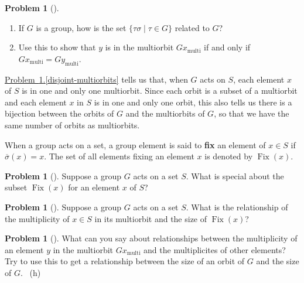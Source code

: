 \documentclass[10pt,]{book}
\newcommand{\terminology}[1]{\textbf{#1}}
\theoremstyle{plain}
\theoremstyle{definition}
\newtheorem{activity}[project]{Problem}
\theoremstyle{definition}
\numberwithin{equation}{chapter}
\DeclareMathOperator{\Fix}{Fix}
\begin{document}
\begin{activity}[]\marginsymbol[-1em]{} \label{activity-292}
\leavevmode%
\begin{enumerate}[font=\bfseries,label=(\alph*),ref=\alph*]
\item\label{compose-right} \marginsymbol[-2.5em]{} \hypertarget{p-1662}{}%
If \(G\) is a group, how is the set \(\{\tau\sigma\mid\tau\in G\}\) related to \(G\)?%
\item\label{disjoint-multiorbits} \marginsymbol[-2.5em]{} \hypertarget{p-1664}{}%
Use this to show that \(y\) is in the multiorbit \(Gx_{\text{multi}}\) if and only if \(Gx_{\text{multi}} = Gy_{\text{multi}}\).%
\end{enumerate}
\end{activity}
\hypertarget{p-1666}{}%
\hyperref[disjoint-multiorbits]{Problem~\ref{activity-292}.\ref{disjoint-multiorbits}} tells us that, when \(G\) acts on \(S\), each element \(x\) of \(S\) is in one and only one multiorbit. Since each orbit is a subset of a multiorbit and each element \(x\) in \(S\) is in one and only one orbit, this also tells us there is a bijection between the orbits of \(G\) and the multiorbits of \(G\), so that we have the same number of orbits as multiorbits.%
\par
\hypertarget{p-1667}{}%
When a group acts on a set, a group element is said to \terminology{fix} an element of \(x \in S\) if \(\overline{\sigma}(x) = x\). The set of all elements fixing an element \(x\) is denoted by \(\Fix(x)\).%
\begin{activity}[]\marginsymbol[-1em]{} \label{activity-293}
\hypertarget{p-1668}{}%
Suppose a group \(G\) acts on a set \(S\). What is special about the subset \(\Fix(x)\) for an element \(x\) of \(S\)?%
\end{activity}
\begin{activity}[] \label{activity-294}
\hypertarget{p-1670}{}%
Suppose a group \(G\) acts on a set \(S\). What is the relationship of the multiplicity of \(x\in S\) in its multiorbit and the size of \(\Fix(x)\)?%
\end{activity}
\begin{activity}[]\marginsymbol[-1em]{} \label{activity-295}
\hypertarget{p-1672}{}%
What can you say about relationships between the multiplicity of an element \(y\) in the multiorbit \(Gx_{\text{multi}}\) and the multiplicites of other elements? Try to use this to get a relationship between the size of an orbit of \(G\) and the size of \(G\).%
~{\tiny (h)}\end{activity}
\end{document}
